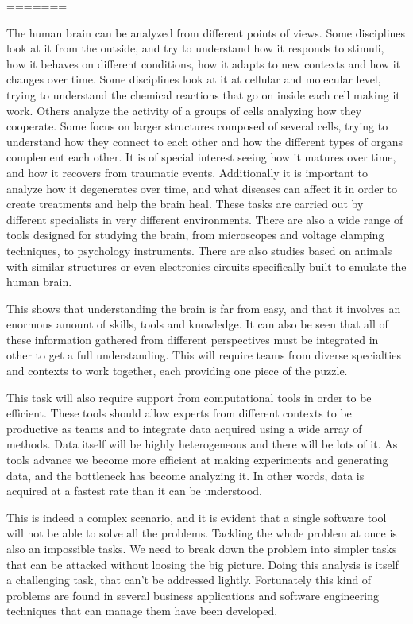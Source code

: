 %
%
=======

The human brain can be analyzed from different points of views. Some disciplines look at it from the outside, and try to understand how it responds to stimuli, how it behaves on different conditions, how it adapts to new contexts and how it changes over time. Some disciplines look at it at cellular and molecular level, trying to understand the chemical reactions that go on inside each cell making it work. Others analyze the activity of a groups of cells analyzing how they cooperate. Some focus on larger structures composed of several cells, trying to understand how they connect to each other and how the different types of organs complement each other. It is of special interest seeing how it matures over time, and how it recovers from traumatic events. Additionally it is important to analyze how it degenerates over time, and what diseases can affect it in order to create treatments and help the brain heal. 
These tasks are carried out by different specialists in very different environments. There are also a wide range of tools designed for studying the brain, from microscopes and voltage clamping techniques, to psychology instruments. There are also studies based on animals with similar structures or even electronics circuits specifically built to emulate the human brain. 

This shows that understanding the brain is far from easy, and that it involves an enormous amount of skills, tools and knowledge. It can also be seen that all of these information gathered from different perspectives must be integrated in other to get a full understanding. This will require teams from diverse specialties and contexts to work together, each providing one piece of the puzzle. 

This task will also require support from computational tools in order to be efficient. These tools should allow experts from different contexts to be productive as teams and to integrate data acquired using a wide array of methods. Data itself will be highly heterogeneous and there will be lots of it. As tools advance we become more efficient at making experiments and generating data, and the bottleneck has become analyzing it. In other words, data is acquired at a fastest rate than it can be understood. 

This is indeed a complex scenario, and it is evident that a single software tool will not be able to solve all the problems. Tackling the whole problem at once is also an impossible tasks. We need to break down the problem into simpler tasks that can be attacked without loosing the big picture. Doing this analysis is itself a challenging task, that can't be addressed lightly. Fortunately this kind of problems are found in several business applications and  software engineering techniques that can manage them have been developed. 

